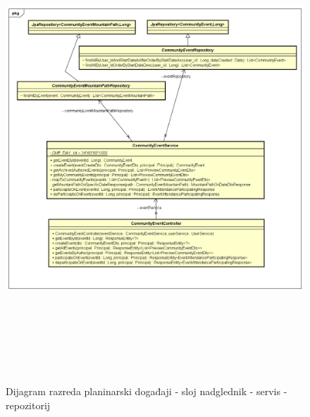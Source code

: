 		\begin{figure}[H]
			\includegraphics[scale=0.6, height=175mm, width=165mm]{dijagrami/csr-event-dijagram} %
			\centering
			\caption{Dijagram razreda planinarski događaji - sloj nadglednik - servis - repozitorij }
			\label{fig:dijagrami_razreda_dogadaj}
		\end{figure}
